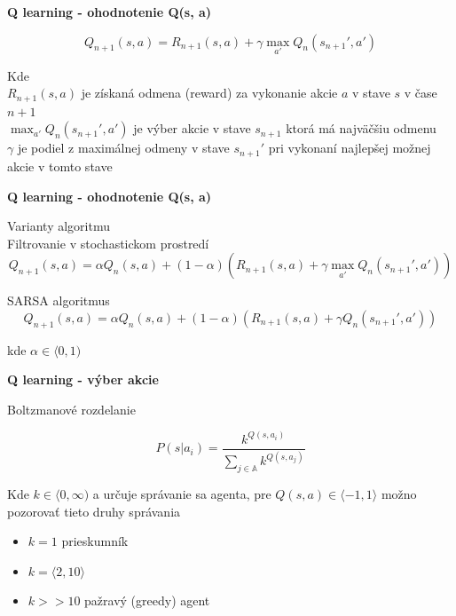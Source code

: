 \documentclass[xcolor=dvipsnames]{beamer}
\begin{document}
\begin{frame}{\bf Q learning - ohodnotenie Q(s, a)}

\begin{equation}
\label{q_learning}
   Q_{n+1}(s, a) = R_{n+1}(s, a) + \gamma \max_{a'} Q_n(s_{n+1}', a')
\end{equation}

Kde \\
$R_{n+1}(s, a)$ je získaná odmena (reward) za vykonanie akcie $a$ v stave $s$ v čase
$n+1$ \\
\bigskip
$\max_{a'} Q_n(s_{n+1}', a')$ je výber akcie v stave $s_{n+1}$ ktorá má najväčšiu odmenu \\
\bigskip
$\gamma$ je podiel z maximálnej odmeny v stave $s_{n+1}'$ pri vykonaní najlepšej
možnej akcie v tomto stave

\end{frame}


\begin{frame}{\bf Q learning - ohodnotenie Q(s, a)}

Varianty algoritmu \\

Filtrovanie v stochastickom prostredí
\begin{equation}
\label{q_learning}
   Q_{n+1}(s, a) = \alpha Q_{n}(s, a) + (1-\alpha) ( R_{n+1}(s, a) + \gamma \max_{a'} Q_n(s_{n+1}', a') ) \nonumber
\end{equation}

SARSA algoritmus
\begin{equation}
\label{q_learning}
   Q_{n+1}(s, a) = \alpha Q_{n}(s, a) + (1-\alpha) ( R_{n+1}(s, a) + \gamma Q_n(s_{n+1}', a') ) \nonumber
\end{equation}

\bigskip
kde $\alpha \in \langle 0, 1) $ \\

\end{frame}


\begin{frame}{\bf Q learning - výber akcie}

Boltzmanové rozdelanie

\begin{equation}
P(s|a_i) = \frac{k^{Q(s, a_i)}} {{\sum_{j \in \mathbb{A}}{} k^{Q(s, a_j)}}} \nonumber
\end{equation}

Kde $k \in \langle 0, \infty )$ a určuje správanie sa agenta, pre $Q(s, a) \in \langle -1, 1 \rangle$
možno pozorovať tieto druhy správania

\begin{itemize}
\item{$k = 1$ prieskumník}
\item{$k = \langle 2, 10 \rangle$}
\item{$k >> 10$ pažravý (greedy) agent}
\end{itemize}

\end{frame}
\end{document}
